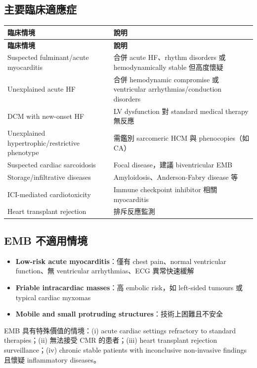 \documentclass[12pt,a4paper]{article}
\newcommand{\note}[1]{
    \par
    \noindent
    \begin{tcolorbox}[
        colback=emergency_blue!5!white,
        colframe=emergency_blue,
        title=\textbf{重點提醒},
        fonttitle=\bfseries,
        boxrule=0.5pt,
        arc=3pt,
        left=6pt,
        right=6pt,
        top=6pt,
        bottom=6pt
    ]
    #1
    \end{tcolorbox}
}
\begin{document}
\subsection{主要臨床適應症}

\begin{longtable}{p{5cm}p{9cm}}
\toprule
\textbf{臨床情境} & \textbf{說明} \\
\midrule
\endfirsthead
\toprule
\textbf{臨床情境} & \textbf{說明} \\
\midrule
\endhead
Suspected fulminant/acute myocarditis & 合併 acute HF、rhythm disorders 或 hemodynamically stable 但高度懷疑 \\
\midrule
Unexplained acute HF & 合併 hemodynamic compromise 或 ventricular arrhythmias/conduction disorders \\
\midrule
DCM with new-onset HF & LV dysfunction 對 standard medical therapy 無反應 \\
\midrule
Unexplained hypertrophic/restrictive phenotype & 需鑑別 sarcomeric HCM 與 phenocopies（如 CA） \\
\midrule
Suspected cardiac sarcoidosis & Focal disease，建議 biventricular EMB \\
\midrule
Storage/infiltrative diseases & Amyloidosis、Anderson-Fabry disease 等 \\
\midrule
ICI-mediated cardiotoxicity & Immune checkpoint inhibitor 相關 myocarditis \\
\midrule
Heart transplant rejection & 排斥反應監測 \\
\bottomrule
\end{longtable}

\subsection{EMB 不適用情境}

\begin{itemize}
    \item \textbf{Low-risk acute myocarditis}：僅有 chest pain、normal ventricular function、無 ventricular arrhythmias、ECG 異常快速緩解
    \item \textbf{Friable intracardiac masses}：高 embolic risk，如 left-sided tumours 或 typical cardiac myxomas
    \item \textbf{Mobile and small protruding structures}：技術上困難且不安全
\end{itemize}

\note{
EMB 具有特殊價值的情境：(i) acute cardiac settings refractory to standard therapies；(ii) 無法接受 CMR 的患者；(iii) heart transplant rejection surveillance；(iv) chronic stable patients with inconclusive non-invasive findings 且懷疑 inflammatory diseases。
}
\end{document}
